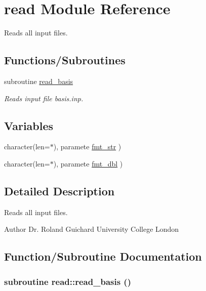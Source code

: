 \hypertarget{namespaceread}{
\section{read Module Reference}
\label{namespaceread}
}


Reads all input files.  
\subsection*{Functions/Subroutines}
\begin{DoxyCompactItemize}
\item 
subroutine \hyperlink{namespaceread_ad2d1fbc89fe20fbc19d9e322f246bb82}{read\_\-basis}
\begin{DoxyCompactList}\small\item\em Reads input file basis.inp. \item\end{DoxyCompactList}\end{DoxyCompactItemize}
\subsection*{Variables}
\begin{DoxyCompactItemize}
\item 
character(len=$\ast$), paramete \hyperlink{namespaceread_a58ca3da45698b8c19b442970b4e75ec6}{fmt\_\-str} )
\item 
character(len=$\ast$), paramete \hyperlink{namespaceread_ade3b381a293cace1ee9e385aa863e859}{fmt\_\-dbl} )
\end{DoxyCompactItemize}


\subsection{Detailed Description}
Reads all input files. \begin{DoxyAuthor}{Author}
Dr. Roland Guichard University College London 
\end{DoxyAuthor}


\subsection{Function/Subroutine Documentation}
\hypertarget{namespaceread_ad2d1fbc89fe20fbc19d9e322f246bb82}{
\subsubsection[{read\_\-basis}]{\setlength{\rightskip}{0pt plus 5cm}subroutine read::read\_\-basis ()}}
\label{namespaceread_ad2d1fbc89fe20fbc19d9e322f246bb82}


